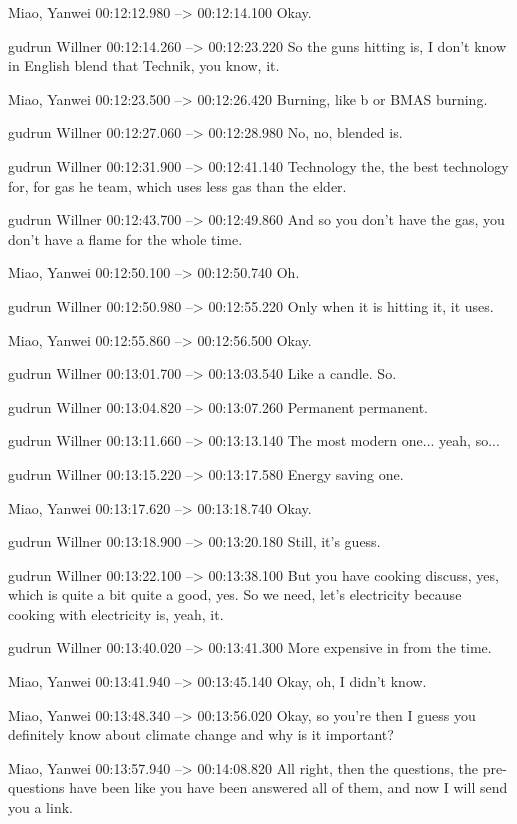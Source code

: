 {Miao, Yanwei 00:12:12.980 --> 00:12:14.100
Okay.

gudrun Willner 00:12:14.260 --> 00:12:23.220
So the guns hitting is, I don't know in English blend that Technik, you know, it.

Miao, Yanwei 00:12:23.500 --> 00:12:26.420
Burning, like b or BMAS burning.

gudrun Willner 00:12:27.060 --> 00:12:28.980
No, no, blended is.

gudrun Willner 00:12:31.900 --> 00:12:41.140
Technology the, the best technology for, for gas he team, which uses less gas than the elder.

gudrun Willner 00:12:43.700 --> 00:12:49.860
And so you don't have the gas, you don't have a flame for the whole time.

Miao, Yanwei 00:12:50.100 --> 00:12:50.740
Oh.

gudrun Willner 00:12:50.980 --> 00:12:55.220
Only when it is hitting it, it uses.

Miao, Yanwei 00:12:55.860 --> 00:12:56.500
Okay.

gudrun Willner 00:13:01.700 --> 00:13:03.540
Like a candle. So.

gudrun Willner 00:13:04.820 --> 00:13:07.260
Permanent permanent.

gudrun Willner 00:13:11.660 --> 00:13:13.140
The most modern one... yeah, so...

gudrun Willner 00:13:15.220 --> 00:13:17.580
Energy saving one.

Miao, Yanwei 00:13:17.620 --> 00:13:18.740
Okay.

gudrun Willner 00:13:18.900 --> 00:13:20.180
Still, it's guess.

gudrun Willner 00:13:22.100 --> 00:13:38.100
But you have cooking discuss, yes, which is quite a bit quite a good, yes. So we need, let's electricity because cooking with electricity is, yeah, it.

gudrun Willner 00:13:40.020 --> 00:13:41.300
More expensive in from the time.

Miao, Yanwei 00:13:41.940 --> 00:13:45.140
Okay, oh, I didn't know.

Miao, Yanwei 00:13:48.340 --> 00:13:56.020
Okay, so you're then I guess you definitely know about climate change and why is it important?

Miao, Yanwei 00:13:57.940 --> 00:14:08.820
All right, then the questions, the pre- questions have been like you have been answered all of them, and now I will send you a link.

}
